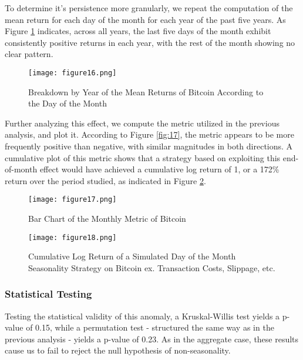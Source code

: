 \documentclass[
]{article}
\begin{document}
To determine it's persistence more granularly, we repeat the computation
of the mean return for each day of the month for each year of the past
five years. As Figure \textcolor{blue}{\ref{fig:16}} indicates, across
all years, the last five days of the month exhibit consistently positive
returns in each year, with the rest of the month showing no clear
pattern.

\begin{figure}[H]
    \centering
    \texttt{[image: figure16.png]}
    \caption{Breakdown by Year of the Mean Returns of Bitcoin According to the Day of the Month}
    \label{fig:16}
\end{figure}

Further analyzing this effect, we compute the metric utilized in the
previous analysis, and plot it. According to Figure
\textcolor{blue}{\ref{fig:17}}, the metric appears to be more frequently
positive than negative, with similar magnitudes in both directions. A
cumulative plot of this metric shows that a strategy based on exploiting
this end-of-month effect would have achieved a cumulative log return of
1, or a 172\% return over the period studied, as indicated in Figure
\textcolor{blue}{\ref{fig:18}}.

\begin{figure}[H]
    \centering
    \begin{minipage}{0.45\textwidth}
        \centering
        \texttt{[image: figure17.png]}
        \caption{Bar Chart of the Monthly Metric of Bitcoin}
        \label{fig:17}
    \end{minipage}
    \hfill
    \begin{minipage}{0.45\textwidth}
        \centering
        \texttt{[image: figure18.png]}
        \caption{Cumulative Log Return of a Simulated Day of the Month Seasonality Strategy on Bitcoin ex. Transaction Costs, Slippage, etc.}
        \label{fig:18}
    \end{minipage}
\end{figure}

\subsubsection{Statistical Testing}\label{statistical-testing-3}

Testing the statistical validity of this anomaly, a Kruskal-Willis test
yields a p-value of 0.15, while a permutation test - structured the same
way as in the previous analysis - yields a p-value of 0.23. As in the
aggregate case, these results cause us to fail to reject the null
hypothesis of non-seasonality.
\end{document}
